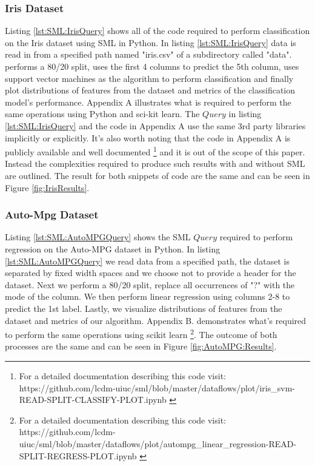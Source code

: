 \subsubsection{Iris Dataset}
Listing \ref{lst:SML:IrisQuery} shows all of the code required to perform classification on the Iris dataset using SML in Python.  In listing \ref{lst:SML:IrisQuery} data is read in from a specified path named "iris.csv" of a subdirectory called "data". performs a 80/20 split, uses the first 4 columns to predict the 5th column, uses support vector machines as the algorithm to perform classification and finally plot distributions of features from the dataset and metrics of the classification model's performance.  Appendix A illustrates what is required to perform the same operations using Python and sci-kit learn.  The \(Query\) in listing \ref{lst:SML:IrisQuery} and the code in Appendix A use the same 3rd party libraries implicitly or explicitly.  It's also worth noting that the code in Appendix A is publicly available and well documented \footnote{For a detailed documentation describing this code visit: https://github.com/lcdm-uiuc/sml/blob/master/dataflows/plot/iris\_svm-READ-SPLIT-CLASSIFY-PLOT.ipynb \label{lab:iris:git}} and it is out of the scope of this paper.  Instead the complexities required to produce such results with and without SML are outlined.  The result for both snippets of code are the same and can be seen in Figure \ref{fig:IrisResults}.

\subsubsection{Auto-Mpg Dataset}
Listing  \ref{lst:SML:AutoMPGQuery} shows the SML \(Query\) required to perform regression on the Auto-MPG dataset in Python.  In listing \ref{lst:SML:AutoMPGQuery} we read data from a specified path, the dataset is separated by fixed width spaces and we choose not to provide a header for the dataset.  Next we perform a 80/20 split, replace all occurrences of "?" with the mode of the column. We then perform linear regression using columns 2-8 to predict the 1st label. Lastly, we visualize distributions of features from the dataset and metrics of our algorithm.  Appendix B.  demonstrates what's required to perform the same operations using scikit learn \footnote{For a detailed documentation describing this code visit: https://github.com/lcdm-uiuc/sml/blob/master/dataflows/plot/autompg\_linear\_regression-READ-SPLIT-REGRESS-PLOT.ipynb \label{lab:SML:AUTO}}. The outcome of both processes are the same and can be seen in Figure \ref{fig:AutoMPG:Results}.

